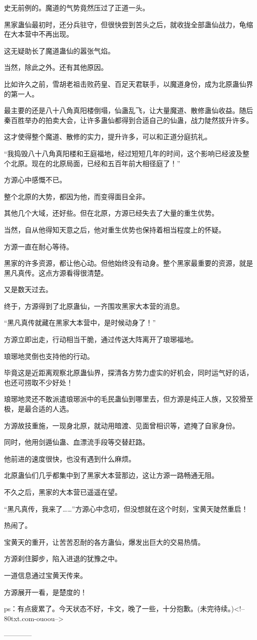 \begin{this_body}
史无前例的。魔道的气势竟然压过了正道一头。

黑家蛊仙最初时，还分兵驻守，但很快尝到苦头之后，就收拢全部蛊仙战力，龟缩在大本营中不再出现。

这无疑助长了魔道蛊仙的嚣张气焰。

当然，除此之外。还有其他原因。

比如许久之前，雪胡老祖击败药皇、百足天君联手，以魔道身份，成为北原蛊仙界的第一人。

最主要的还是八十八角真阳楼倒塌，仙蛊乱飞，让大量魔道、散修蛊仙收益。随后秦百胜举办的拍卖大会，让许多蛊仙都得到合适自己的仙蛊，战力陡然拔升许多。

这才使得整个魔道、散修的实力，提升许多，可以和正道分庭抗礼。

“我捣毁八十八角真阳楼和王庭福地，经过短短几年的时间，这个影响已经波及整个北原。现在的北原局面，已经和五百年前大相径庭了！”

方源心中感慨不已。

整个北原的大势，都因为他，而变得面目全非。

其他几个大域，还好些。但在北原，方源已经失去了大量的重生优势。

当然，自从他得知天意之后，他对重生优势也保持着相当程度上的怀疑。

方源一直在耐心等待。

黑家的许多资源，都让他心动。但他始终没有动身。整个黑家最重要的资源，就是黑凡真传。这点方源看得很清楚。

又是数天过去。

终于，方源得到了北原蛊仙，一齐围攻黑家大本营的消息。

“黑凡真传就藏在黑家大本营中，是时候动身了！”

方源立即出走，行动相当干脆，通过传送大阵离开了琅琊福地。

琅琊地灵倒也支持他的行动。

毕竟这是近距离观察北原蛊仙界，探清各方势力虚实的好机会，同时运气好的话，也还可捞取不少好处！

琅琊地灵还不敢派遣琅琊派中的毛民蛊仙到哪里去，但方源是纯正人族，又狡猾至极，是最合适的人选。

方源故技重施，一现身北原，就动用暗渡、见面曾相识等，遮掩了自家身份。

同时，他用剑遁仙蛊、血漂流手段等交替赶路。

他前进的速度很快，也没有遇到什么麻烦。

北原蛊仙们几乎都集中到了黑家大本营那边，这让方源一路畅通无阻。

不久之后，黑家的大本营已遥遥在望。

“黑凡真传，我来了……”方源心中念叨，但没想就在这个时刻，宝黄天陡然重启！

热闹了。

宝黄天的重开，让苦苦忍耐的各方蛊仙，爆发出巨大的交易热情。

方源刹住脚步，陷入进退的犹豫之中。

一道信息通过宝黄天传来。

方源展开一看，是楚度的！

ps：有点疲累了。今天状态不好，卡文，晚了一些，十分抱歉。(未完待续。)<!--80txt.com-ouoou-->

------------

\end{this_body}

